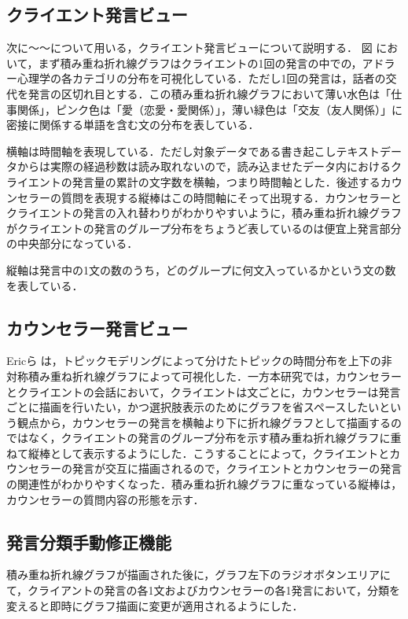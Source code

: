 \documentclass[shuuron]{kuee}
\begin{document}
\subsection{クライエント発言ビュー}
次に〜〜について用いる，クライエント発言ビューについて説明する．
図
において，まず積み重ね折れ線グラフはクライエントの1回の発言の中での，アドラー心理学の各カテゴリの分布を可視化している．ただし1回の発言は，話者の交代を発言の区切れ目とする．この積み重ね折れ線グラフにおいて薄い水色は「仕事関係」，ピンク色は「愛（恋愛・愛関係）」，薄い緑色は「交友（友人関係）」に密接に関係する単語を含む文の分布を表している．

横軸は時間軸を表現している．ただし対象データである書き起こしテキストデータからは実際の経過秒数は読み取れないので，読み込ませたデータ内におけるクライエントの発言量の累計の文字数を横軸，つまり時間軸とした．後述するカウンセラーの質問を表現する縦棒はこの時間軸にそって出現する．カウンセラーとクライエントの発言の入れ替わりがわかりやすいように，積み重ね折れ線グラフがクライエントの発言のグループ分布をちょうど表しているのは便宜上発言部分の中央部分になっている．

縦軸は発言中の1文の数のうち，どのグループに何文入っているかという文の数を表している．





\subsection{カウンセラー発言ビュー}

Ericら\cite{taskdriven}
は，トピックモデリングによって分けたトピックの時間分布を上下の非対称積み重ね折れ線グラフによって可視化した．一方本研究では，カウンセラーとクライエントの会話において，クライエントは文ごとに，カウンセラーは発言ごとに描画を行いたい，かつ選択肢表示のためにグラフを省スペースしたいという観点から，カウンセラーの発言を横軸より下に折れ線グラフとして描画するのではなく，クライエントの発言のグループ分布を示す積み重ね折れ線グラフに重ねて縦棒として表示するようにした．こうすることによって，クライエントとカウンセラーの発言が交互に描画されるので，クライエントとカウンセラーの発言の関連性がわかりやすくなった．積み重ね折れ線グラフに重なっている縦棒は，カウンセラーの質問内容の形態を示す．


\subsection{発言分類手動修正機能}
積み重ね折れ線グラフが描画された後に，グラフ左下のラジオボタンエリアにて，クライアントの発言の各1文およびカウンセラーの各1発言において，分類を変えると即時にグラフ描画に変更が適用されるようにした．
\end{document}
